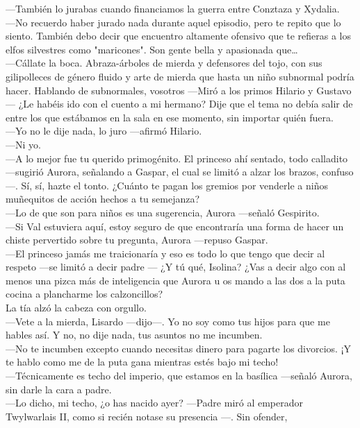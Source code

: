 \documentclass[
  letterpaper,
]{book}
\begin{document}
---También lo jurabas cuando financiamos la guerra entre Conztaza y
Xydalia.\\
---No recuerdo haber jurado nada durante aquel episodio, pero te repito
que lo siento. También debo decir que encuentro altamente ofensivo que
te refieras a los elfos silvestres como "maricones". Son gente bella y
apasionada que\ldots{}\\
---Cállate la boca. Abraza-árboles de mierda y defensores del tojo, con
sus gilipolleces de género fluido y arte de mierda que hasta un niño
subnormal podría hacer. Hablando de subnormales, vosotros ---Miró a los
primos Hilario y Gustavo --- ¿Le habéis ido con el cuento a mi hermano?
Dije que el tema no debía salir de entre los que estábamos en la sala en
ese momento, sin importar quién fuera.\\
---Yo no le dije nada, lo juro ---afirmó Hilario.\\
---Ni yo.\\
---A lo mejor fue tu querido primogénito. El princeso ahí sentado, todo
calladito ---sugirió Aurora, señalando a Gaspar, el cual se limitó a
alzar los brazos, confuso ---. Sí, sí, hazte el tonto. ¿Cuánto te pagan
los gremios por venderle a niños muñequitos de acción hechos a tu
semejanza?\\
---Lo de que son para niños es una sugerencia, Aurora ---señaló
Gespirito.\\
---Si Val estuviera aquí, estoy seguro de que encontraría una forma de
hacer un chiste pervertido sobre tu pregunta, Aurora ---repuso Gaspar.\\
---El princeso jamás me traicionaría y eso es todo lo que tengo que
decir al respeto ---se limitó a decir padre --- ¿Y tú qué, Isolina? ¿Vas
a decir algo con al menos una pizca más de inteligencia que Aurora u os
mando a las dos a la puta cocina a plancharme los calzoncillos?\\
La tía alzó la cabeza con orgullo.\\
---Vete a la mierda, Lisardo ---dijo---. Yo no soy como tus hijos para
que me hables así. Y no, no dije nada, tus asuntos no me incumben.\\
---No te incumben excepto cuando necesitas dinero para pagarte los
divorcios. ¡Y te hablo como me de la puta gana mientras estés bajo mi
techo!\\
---Técnicamente es techo del imperio, que estamos en la basílica
---señaló Aurora, sin darle la cara a padre.\\
---Lo dicho, mi techo, ¿o has nacido ayer? ---Padre miró al emperador
Twylwarlais II, como si recién notase su presencia ---. Sin ofender,
\end{document}
